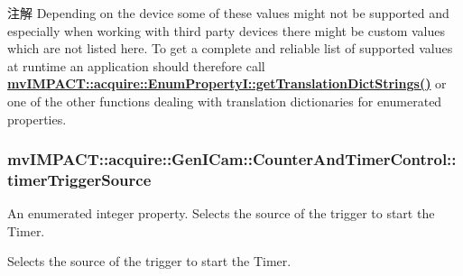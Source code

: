 \begin{DoxyNote}{注解}
Depending on the device some of these values might not be supported and especially when working with third party devices there might be custom values which are not listed here. To get a complete and reliable list of supported values at runtime an application should therefore call {\bfseries \hyperlink{classmv_i_m_p_a_c_t_1_1acquire_1_1_enum_property_i_a0ba6ccbf5ee69784d5d0b537924d26b6}{mv\+I\+M\+P\+A\+C\+T\+::acquire\+::\+Enum\+Property\+I\+::get\+Translation\+Dict\+Strings()}} or one of the other functions dealing with translation dictionaries for enumerated properties. 
\end{DoxyNote}
\hypertarget{classmv_i_m_p_a_c_t_1_1acquire_1_1_gen_i_cam_1_1_counter_and_timer_control_ace2a27d5ef880f1590cca9313ec84684}{
\subsubsection[{timer\+Trigger\+Source}]{ mv\+I\+M\+P\+A\+C\+T\+::acquire\+::\+Gen\+I\+Cam\+::\+Counter\+And\+Timer\+Control\+::timer\+Trigger\+Source}}\label{classmv_i_m_p_a_c_t_1_1acquire_1_1_gen_i_cam_1_1_counter_and_timer_control_ace2a27d5ef880f1590cca9313ec84684}


An enumerated integer property. Selects the source of the trigger to start the Timer. 

Selects the source of the trigger to start the Timer.

